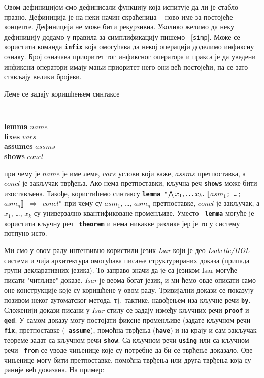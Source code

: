 Овом дефиницијом смо дефинисали функцију која испитује да ли је стабло
празно. Дефиниција је на неки начин скраћеница -- ново име за
постојеће концепте. Дефиниција не може бити рекурзивна. Уколико желимо
да неку дефиницију додамо у правила за симплификацију пишемо {\tt
  $[$simp$]$}. Може се користити команда {\tt \textbf{infix}} која
омогућава да некој операцији доделимо инфиксну ознаку. Број означава
приоритет тог инфиксног оператора и пракса је да уведени инфиксни
оператори имају мањи приоритет него они већ постојећи, па се зато
стављају велики бројеви. 

Леме се задају коришћењем синтаксе 
{\tt 
\begin{tabbing}
\textbf{lem}\=\textbf{ma} $name$\\
  \>\textbf{fixes} $vars$  \\
  \>\textbf{assumes} $assms$ \\
  \>\textbf{shows} $concl$
\end{tabbing}
} 

\noindent при чему је $name$ је име леме, $vars$ услови који важе,
$assms$ претпоставка, а $concl$ је закључак тврђења. Ако нема
претпоставки, кључна реч {\tt \textbf{shows}} може бити
изостављена. Такође, користићемо синтаксу {\tt \textbf{lemma}
  "$\bigwedge x_1, \ldots x_k.\ \lbrakk$$asm_1$; \ldots;
  $asm_n$$\rrbracket$ $\Longrightarrow$ $concl$"} при чему су $asm_1$,
\ldots, $asm_n$ претпоставке, $concl$ је закључак, а $x_1$, \ldots,
$x_k$ су универзално квантификоване променљиве. Уместо {\tt
  \textbf{lemma}} могуће је користити кључну реч {\tt
  \textbf{theorem}} и нема никакве разлике јер је то у систему потпуно
исто.

Ми смо у овом раду интензивно користили језик \emph{Isar} који је део
\emph{Isabelle/HOL} система и чија архитектура омогућава писање
структурираних доказа (припада групи декларативних језика). То заправо
значи да је са језиком Isar могуће писати "читљиве"
доказе. \emph{Isar} је веома богат језик, и ми ћемо овде описати само
оне конструкције које су коришћене у овом раду.  Тривијални докази се
показују позивом неког аутоматског метода, тј.~тактике, навођењем иза
кључне речи \textbf{\tt {by}}. Сложенији докази писани у \emph{Isar}
стилу се задају између кључних речи {\tt \textbf{proof}} и {\tt
  \textbf{qed}}. У самом доказу могу постојати фиксне променљиве
(задате кључном речи {\tt \textbf{fix}}, претпоставке ({\tt
  \textbf{assume}}), помоћна тврђења ({\tt \textbf{have}}) и на крају
и сам закључак теореме задат са кључном речи {\tt \textbf{show}}. Са
кључном речи {\tt \textbf{using}} или са кључном речи {\tt
  \textbf{from}} се уводе чињенице које су потребне да би се тврђење
доказало. Ове чињенице могу бити претпоставке, помоћна тврђења или
друга тврђења која су раније већ доказана. На пример:

